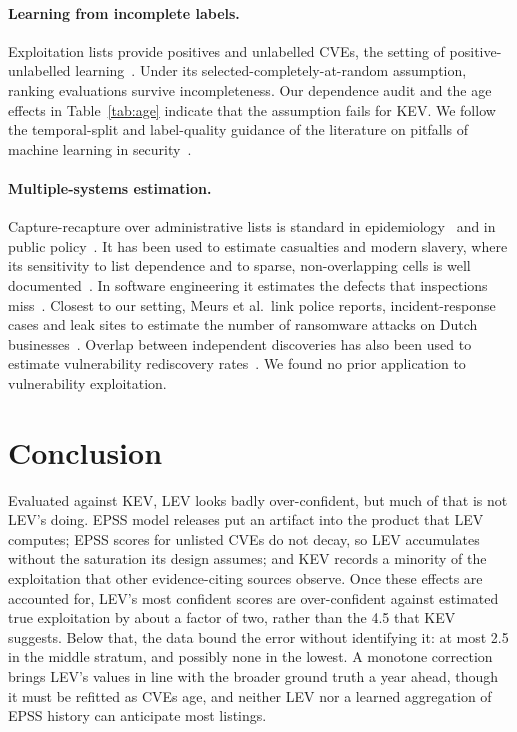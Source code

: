 \paragraph{Learning from incomplete labels.} Exploitation lists provide
positives and unlabelled CVEs, the setting of positive-unlabelled
learning~\cite{elkan2008pu,bekker2020pu}. Under its
selected-completely-at-random assumption, ranking evaluations survive
incompleteness. Our dependence audit and the age effects in
Table~\ref{tab:age} indicate that the assumption fails for KEV. We follow the
temporal-split and label-quality guidance of the literature on pitfalls of
machine learning in security~\cite{arp2022dos,pendlebury2019tesseract}.

\paragraph{Multiple-systems estimation.} Capture-recapture over administrative
lists is standard in epidemiology~\cite{iwgdmf1995} and in public
policy~\cite{bird2018mse}. It has been used to estimate casualties and modern
slavery, where its sensitivity to list dependence and to sparse,
non-overlapping cells is well documented~\cite{binette2022mse,chan2021sparse}.
In software engineering it estimates the defects that inspections
miss~\cite{petersson2004inspection}. Closest to our setting, Meurs et al.\ link
police reports, incident-response cases and leak sites to estimate the number
of ransomware attacks on Dutch businesses~\cite{meurs2026ransomware}. Overlap
between independent discoveries has also been used to estimate vulnerability
rediscovery rates~\cite{herr2017rediscovery,ablon2017zeroday}. We found no
prior application to vulnerability exploitation.

\section{Conclusion}\label{sec:conclusion}

Evaluated against KEV, LEV looks badly over-confident, but much of that is not
LEV's doing. EPSS model releases put an artifact into the product that LEV
computes; EPSS scores for unlisted CVEs do not decay, so LEV accumulates without
the saturation its design assumes; and KEV records a minority of the
exploitation that other evidence-citing sources observe. Once these effects are
accounted for, LEV's most confident scores are over-confident against
estimated true exploitation by about a factor of two, rather than the 4.5 that
KEV suggests.
Below that, the data bound the error without identifying it: at most 2.5 in the
middle stratum, and possibly none in the lowest. A monotone correction brings
LEV's values in line with the broader ground truth a year ahead, though it must
be refitted as CVEs age, and neither LEV nor a learned aggregation of EPSS
history can anticipate most listings.

